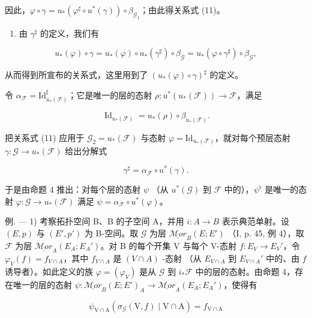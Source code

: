 因此，\(\varphi \circ \gamma = u_{*}(\varphi^{\sharp}\circ u^{*}(\gamma))\circ \beta_{\mathcal{G}_{1}}\)；由此得关系式 (11)。

\begin{enumerate}
\def\labelenumi{\alph{enumi})}
\setcounter{enumi}{1}
\tightlist
\item
  由 \(\gamma^{\sharp}\) 的定义，我们有
\end{enumerate}

\[
u _ {*} (\varphi) \circ \gamma = u _ {*} (\varphi) \circ u _ {*} (\gamma^ {\sharp}) \circ \beta_ {\mathcal {G}} = u _ {*} (\varphi \circ \gamma^ {\sharp}) \circ \beta_ {\mathcal {G}},
\]

从而得到所宣布的关系式，这里用到了 \((u_{*}(\varphi)\circ\gamma)^{\sharp}\) 的定义。

令 \(\alpha_{\mathcal{F}} = \mathrm{Id}_{u_*(\mathcal{F})}^\sharp\)；它是唯一的层的态射 \(\rho \colon u^*(u_*(\mathcal{F})) \to \mathcal{F}\)，满足

\[
\operatorname{Id} _ {u _ {*} (\mathcal {F})} = u _ {*} (\rho) \circ \beta_ {u _ {*} (\mathcal {F})}.
\]

把关系式 (11) 应用于 \(\mathcal{G}_2 = u_*(\mathcal{F})\) 与态射 \(\varphi = \mathrm{Id}_{u_*(\mathcal{F})}\)，就对每个预层态射 \(\gamma\colon\mathcal{G}\to u_*(\mathcal{F})\) 给出分解式

\[
\gamma^ {\sharp} = \alpha_ {\mathcal {F}} \circ u ^ {*} (\gamma).
\]

于是由命题 4 推出：对每个层的态射 \(\psi\) （从 \(u^{*}(\mathcal{G})\) 到 \(\mathcal{F}\) 中的），\(\psi^{\flat}\) 是唯一的态射 \(\varphi\colon\mathcal{G}\to u_{*}(\mathcal{F})\) 满足 \(\psi=\alpha_{\mathcal{F}}\circ u^{*}(\varphi)\)。

例. --- 1) 考察拓扑空间 B、B 的子空间 A，并用 \(i\colon A \to B\) 表示典范单射。设 \((E,p)\) 与 \((E',p')\) 为 B-空间。取 \(\mathcal{G}\) 为层 \(\underline{\mathcal{M}or}_{B}(E;E')\) （I, p. 45, 例 4），取 \(\mathcal{F}\) 为层 \(\underline{\mathcal{M}or}_{A}(E_{A};E_{A}')\)。对 B 的每个开集 V 与每个 V-态射 \(f\colon E_{V} \to E_{V}'\)，令 \(\varphi_{V}(f) = f_{V \cap A}\)，其中 \(f_{V \cap A}\) 是 \((V \cap A)\) -态射 （从 \(E_{V \cap A}\) 到 \(E_{V \cap A}'\) 中的、由 \(f\) 诱导者）。如此定义的族 \(\varphi = (\varphi_{V})\) 是从 \(\mathcal{G}\) 到 \(i_*\mathcal{F}\) 中的层的态射。由命题 4，存在唯一的层的态射 \(\psi\colon \underline{\mathcal{M}or}_{B}(E;E')_{A} \to \underline{\mathcal{M}or}_{A}(E_{A};E_{A}')\)，使得有

\[
\psi_ {\mathrm{V} \cap \mathrm{A}} (\sigma_ {\mathcal {G}} (\mathrm{V}, f) \mid \mathrm{V} \cap \mathrm{A}) = f _ {\mathrm{V} \cap \mathrm{A}}\tag{12}
\]

